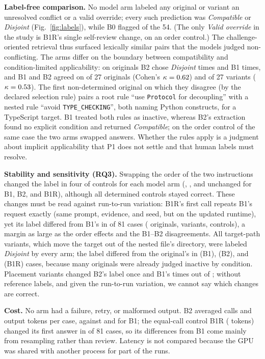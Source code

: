 \textbf{Label-free comparison.} No model arm labeled any original or variant an unresolved conflict or a valid override;
every such prediction was \emph{Compatible} or \emph{Disjoint} (Fig.~\ref{fig:labels}), while B0 flagged
\BZeroCalledConfAnn{} of the 54. (The only \emph{Valid override} in the study is B1R's single self-review change, on an
order control.) The challenge-oriented retrieval thus surfaced lexically similar pairs that the models judged
non-conflicting. The arms differ on the boundary between compatibility and condition-limited applicability: on originals
B2 chose \emph{Disjoint} \BTwoDistOrigDisjoint{} times and B1 \BOneDistOrigDisjoint{} times, and B1 and B2 agreed on
\AgreeBOneBTwoOrigSame{} of 27 originals (Cohen's $\kappa = 0.62$) and \AgreeBOneBTwoVarSame{} of 27
variants ($\kappa = 0.53$). The first non-determined original on which they disagree (by the declared
selection rule) pairs a root rule ``use \texttt{Protocol} for decoupling'' with a nested rule ``avoid
\texttt{TYPE\_CHECKING}'', both naming Python constructs, for a TypeScript target. B1 treated both rules as inactive,
whereas B2's extraction found no explicit condition and returned \emph{Compatible}; on the order control of the same
case the two arms swapped answers. Whether the rules apply is a judgment about implicit applicability that P1 does not
settle and that human labels must resolve.

\textbf{Stability and sensitivity (RQ3).} Swapping the order of the two instructions changed the label in four of
\NControls{} controls for each model arm (\BOneOrderStable{}, \BTwoOrderStable{}, and \BOneROrderStable{} unchanged for
B1, B2, and B1R), although all \NPDCtrl{} determined controls stayed correct. These changes must be read against
run-to-run variation: B1R's first call repeats B1's request exactly (same prompt, evidence, and seed, but on the updated
runtime), yet its label differed from B1's in \RepeatDiffTotal{} of 81 cases (\RepeatDiffOrig{} originals,
\RepeatDiffVar{} variants, \RepeatDiffCtrl{} controls), a margin as large as the order effects and the B1--B2
disagreements. All \NVarTarget{} target-path variants, which move the target out of the nested file's directory, were
labeled \emph{Disjoint} by every arm; the label differed from the original's in \BOneTVChanged{} (B1), \BTwoTVChanged{}
(B2), and \BOneRTVChanged{} (B1R) cases, because many originals were already judged inactive by condition. Placement
variants changed B2's label once and B1's \BOnePVChanged{} times out of \NVarPlacement{}; without reference labels, and
given the run-to-run variation, we cannot say which changes are correct.

\textbf{Cost.} No arm had a failure, retry, or malformed output. B2 averaged \BTwoCallsPerCase{} calls and
\BTwoMeanOut{} output tokens per case, against \BOneCallsPerCase{} and \BOneMeanOut{} for B1; the equal-call control B1R
(\BOneRMeanOut{} tokens) changed its first answer in \BOneRReviewChanged{} of 81 cases, so its differences from B1 come
mainly from resampling rather than review. Latency is not compared because the GPU was shared with another process for
part of the runs.
